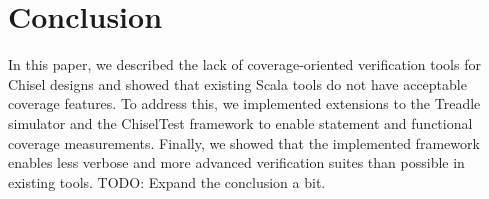 \documentclass[conference]{IEEEtran}
\newcommand{\todo}[1]{{\color{olive} TODO: #1}}
\newcommand{\andrew}[1]{{\color{red} Andrew: #1}}
\newcommand{\hjd}[1]{{\color{pink} Hans: #1}}
\begin{document}

\section{Conclusion}

In this paper, we described the lack of coverage-oriented verification tools 
for Chisel designs and showed that existing Scala tools do not have acceptable coverage features. To 
address this, we implemented extensions to the Treadle simulator and the ChiselTest framework 
to enable statement and functional coverage measurements. Finally, we showed that the implemented 
framework enables less verbose and more advanced verification suites than possible in existing tools. \todo{Expand the conclusion a bit.}
\end{document}
